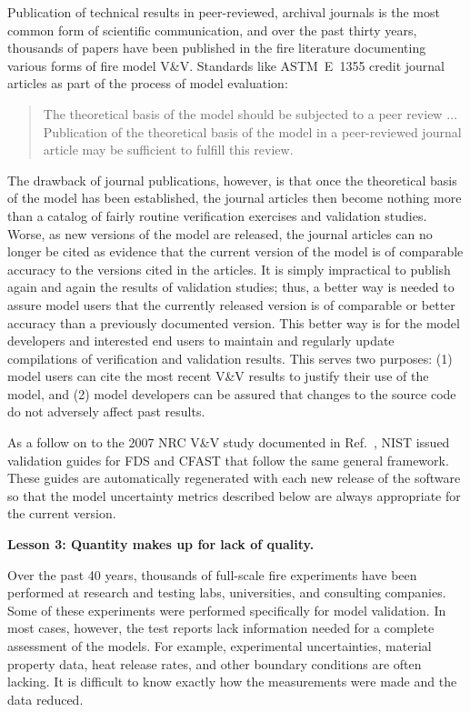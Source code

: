 \documentclass[fleqn,b5paper]{article}
\begin{document}
Publication of technical results in peer-reviewed, archival journals is the most common form of scientific communication, and over the past thirty years, thousands of papers have been published in the fire literature documenting various forms of fire model V\&V. Standards like ASTM~E~1355 credit journal articles as part of the process of model evaluation:
\begin{quote}
The theoretical basis of the model should be subjected to a peer review $\ldots$ Publication of the theoretical basis of the model in a peer-reviewed journal article may be sufficient to fulfill this review.
\end{quote}
The drawback of journal publications, however, is that once the theoretical basis of the model has been established, the journal articles then become nothing more than a catalog of fairly routine verification exercises and validation studies. Worse, as new versions of the model are released, the journal articles can no longer be cited as evidence that the current version of the model is of comparable accuracy to the versions cited in the articles. It is simply impractical to publish again and again the results of validation studies; thus, a better way is needed to assure model users that the currently released version is of comparable or better accuracy than a previously documented version. This better way is for the model developers and interested end users to maintain and regularly update compilations of verification and validation results. This serves two purposes: (1) model users can cite the most recent V\&V results to justify their use of the model, and (2) model developers can be assured that changes to the source code do not adversely affect past results.

As a follow on to the 2007 NRC V\&V study documented in Ref.~\cite{NUREG_1824}, NIST issued validation guides for FDS and CFAST that follow the same general framework. These guides are automatically regenerated with each new release of the software so that the model uncertainty metrics described below are always appropriate for the current version.


\vspace{\parskip}
{\bf Lesson 3: Quantity makes up for lack of quality.}

Over the past 40 years, thousands of full-scale fire experiments have been performed at research and testing labs, universities, and consulting companies. Some of these experiments were performed specifically for model validation. In most cases, however, the test reports lack information needed for a complete assessment of the models. For example, experimental uncertainties, material property data, heat release rates, and other boundary conditions are often lacking. It is difficult to know exactly how the measurements were made and the data reduced. 
\end{document}
